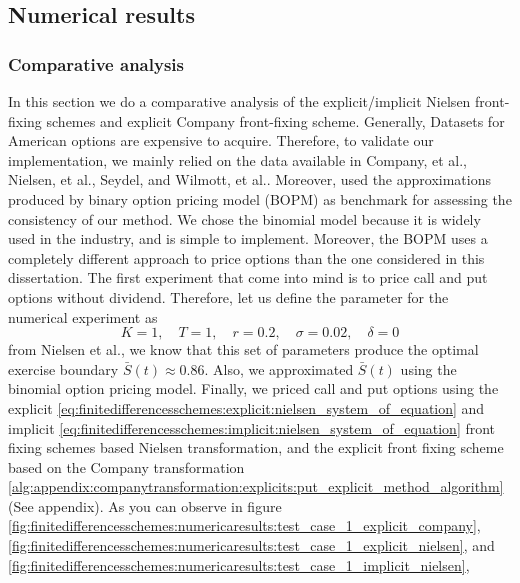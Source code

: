 \subsection{Numerical results}
\subsubsection{Comparative analysis} \label{sec:finitediferencesschemes:numericalresults:numericalexperiments}
In this section we do a comparative analysis of the explicit/implicit Nielsen front-fixing schemes and explicit Company front-fixing scheme. Generally, Datasets for American options are expensive to acquire. Therefore, to validate our implementation, we mainly relied on the data available in Company, 
et al.\cite*{company_egorova_jodar_2014}, Nielsen, et al.\cite*{nielsen_2001}, Seydel\cite*{seydel_2009}, and Wilmott, et al.\cite*{dewynne_howison_wilmott_howison_1995}. Moreover, used the approximations produced by binary option pricing model\cite{cox_1979} (BOPM)  as benchmark for assessing the consistency of our method. We chose the binomial model because it is widely used in the industry, and is simple to implement. Moreover, the BOPM uses a completely different approach to price options than the one considered in this dissertation. The first experiment that come into mind is to price call and put options without dividend. Therefore, let us define the parameter for the numerical experiment as
\begin{equation}
  \label{eq:numericaresults:parameters_set_1}
  K = 1, \quad T = 1, \quad r=0.2, \quad \sigma=0.02, \quad \delta = 0 
\end{equation}
from Nielsen et al.\cite{nielsen_2001}, we know that this set of parameters produce the optimal exercise boundary $\bar{S}(t) \approx 0.86$. Also, we approximated $\bar{S}(t)$ using the binomial option pricing model. Finally, we priced call and put options using the explicit  \eqref{eq:finitedifferencesschemes:explicit:nielsen_system_of_equation} and implicit \eqref{eq:finitedifferencesschemes:implicit:nielsen_system_of_equation} front fixing schemes based Nielsen transformation, and the explicit front fixing scheme based on the Company transformation \eqref{alg:appendix:companytransformation:explicits:put_explicit_method_algorithm} (See appendix). As you can observe in figure \eqref{fig:finitedifferencesschemes:numericaresults:test_case_1_explicit_company},
\eqref{fig:finitedifferencesschemes:numericaresults:test_case_1_explicit_nielsen}, and \eqref{fig:finitedifferencesschemes:numericaresults:test_case_1_implicit_nielsen},
